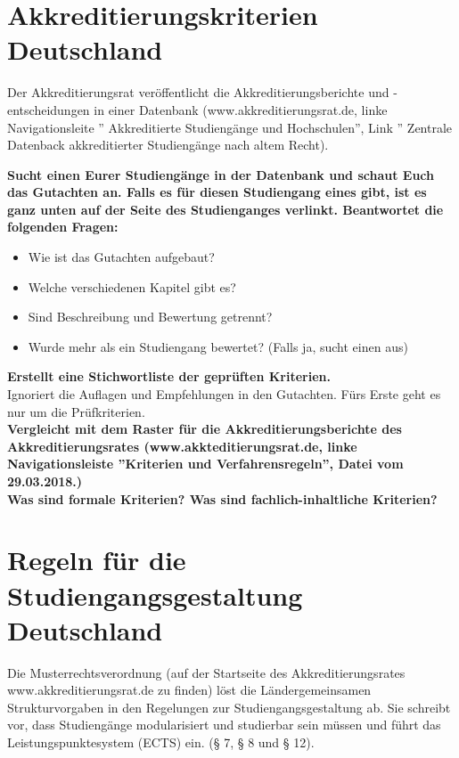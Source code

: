 \documentclass{scrartcl}
\begin{document}
\newpage
\section*{Akkreditierungskriterien Deutschland}
Der Akkreditierungsrat veröffentlicht die Akkreditierungsberichte und -entscheidungen in einer Datenbank (www.akkreditierungsrat.de, linke Navigationsleite '' Akkreditierte Studiengänge und Hochschulen'', Link '' Zentrale Datenback akkreditierter Studiengänge nach altem Recht).\\

\vspace{0.5 cm}

\textbf{Sucht einen Eurer Studiengänge in der Datenbank und schaut Euch das Gutachten an. Falls es für diesen Studiengang eines gibt, ist es ganz unten auf der Seite des Studienganges verlinkt. Beantwortet die folgenden Fragen:}
\begin{itemize}
\item Wie ist das Gutachten aufgebaut?
\item Welche verschiedenen Kapitel gibt es?
\item Sind Beschreibung und Bewertung getrennt?
\item Wurde mehr als ein Studiengang bewertet? (Falls ja, sucht einen aus)
\end{itemize}
\vspace{0.5 cm}
\textbf{Erstellt eine Stichwortliste der geprüften Kriterien.\\}
Ignoriert die Auflagen und Empfehlungen in den Gutachten. Fürs Erste geht es nur um die Prüfkriterien.\\

\vspace{0.5 cm}
 \textbf{Vergleicht mit dem Raster für die Akkreditierungsberichte des Akkreditierungsrates (www.akkteditierungsrat.de, linke Navigationsleiste ''Kriterien und Verfahrensregeln'', Datei vom 29.03.2018.)\\
 Was sind formale Kriterien? Was sind fachlich-inhaltliche Kriterien?}



\newpage
\section*{Regeln für die Studiengangsgestaltung Deutschland}
Die Musterrechtsverordnung (auf der Startseite des Akkreditierungsrates www.akkreditierungsrat.de zu finden) löst die Ländergemeinsamen Strukturvorgaben in den Regelungen zur Studiengangsgestaltung ab.
Sie schreibt vor, dass Studiengänge modularisiert und studierbar sein müssen und führt das Leistungspunktesystem (ECTS) ein. (§ 7, § 8 und § 12).
\end{document}

